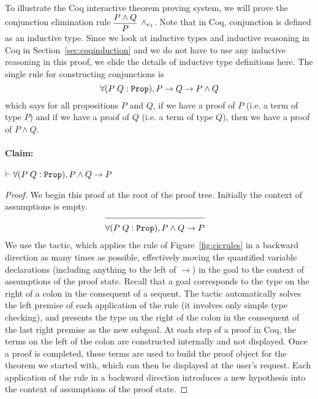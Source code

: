 \begin{expl}
\label{ex:interactivepf}

To illustrate the Coq interactive theorem proving system, we will prove the conjunction elimination rule $\vcenter{\inferH[\wedge_{e_1}]{P}{P \wedge Q}}$. Note that in Coq, conjunction is defined as an inductive type. Since we look at inductive types and inductive reasoning in Coq in Section~\ref{sec:coqinduction} and we do not have to use any inductive reasoning in this proof, we elide the details of inductive type definitions here. The single rule for constructing conjunctions is
$$
\forall (P \; Q : \texttt{Prop}), P \rightarrow Q \rightarrow P \wedge Q
$$
which says for all propositions $P$ and $Q$, if we have a proof of $P$ (i.e. a term of type $P$) and if we have a proof of $Q$ (i.e. a term of type $Q$), then we have a proof of $P \wedge Q$.

\paragraph{Claim:} $\vdash \forall (P \; Q : \texttt{Prop}), P \wedge Q \rightarrow P$ \\

\begin{proof}
We begin this proof at the root of the proof tree. Initially the context of assumptions is empty.
\begin{align*}
\cline{1-2}
& \forall (P \; Q : \coqtm{Prop}), P \wedge Q \rightarrow P
\end{align*}
We use the  tactic, which applies the  rule of Figure~\ref{fig:cicrules} in a backward direction as many times as possible, effectively moving the quantified variable declarations (including anything to the left of $\rightarrow$) in the goal to the context of assumptions of the proof state. Recall that a goal corresponds to the type on the right of a colon in the consequent of a \coc{} sequent. The  tactic automatically solves the left premise of each application of the  rule (it involves only simple type checking), and presents the type on the right of the colon in the consequent of the last right premise as the new subgoal. At each step of a proof in Coq, the terms on the left of the colon are constructed internally and not displayed. Once a proof is completed, these terms are used to build the proof object for the theorem we started with, which can then be displayed at the user's request. Each application of the  rule in a backward direction introduces a new hypothesis into the context of assumptions of the proof state.


\end{proof}
\end{expl}
